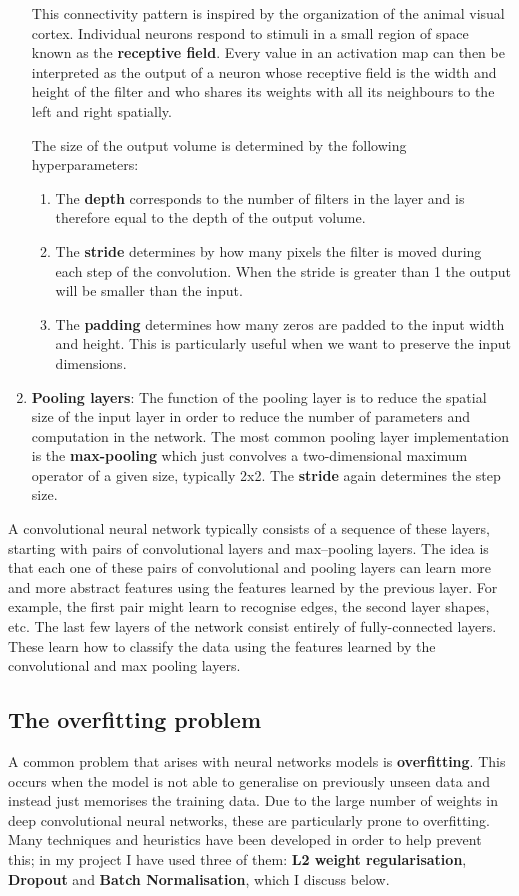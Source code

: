 \documentclass[12pt,a4paper,twoside,openright]{report}
\begin{document}
\begin{enumerate}
	This connectivity pattern is inspired by the organization of the animal visual cortex. Individual neurons respond to stimuli in a small region of space known as the \textbf{receptive field}. Every value in an activation map can then be interpreted as the output of a neuron whose receptive field is the width and height of the filter and who shares its weights with all its neighbours to the left and right spatially.

	The size of the output volume is determined by the following hyperparameters:
	\begin{enumerate}
		\item The \textbf{depth} corresponds to the number of filters in the layer and is therefore equal to the depth of the output volume.
		\item The \textbf{stride} determines by how many pixels the filter is moved during each step of the convolution. When the stride is greater than 1 the output will be smaller than the input.
		\item The \textbf{padding} determines how many zeros are padded to the input width and height. This is particularly useful when we want to preserve the input dimensions.
	\end{enumerate}
	
	\item \textbf{Pooling layers}: The function of the pooling layer is to reduce the spatial size of the input layer in order to reduce the number of parameters and computation in the network. The most common pooling layer implementation is the \textbf{max-pooling} which just convolves a two-dimensional maximum operator of a given size, typically 2x2. The \textbf{stride} again determines the step size.

\end{enumerate}

A convolutional neural network typically consists of a sequence of these layers, starting with pairs of convolutional layers and max--pooling layers. The idea is that each one of these pairs of convolutional and pooling layers can learn more and more abstract features using the features learned by the previous layer. For example, the first pair might learn to recognise edges, the second layer shapes, etc. The last few layers of the network consist entirely of fully-connected layers. These learn how to classify the data using the features learned by the convolutional and max pooling layers.

\subsection{The overfitting problem}
A common problem that arises with neural networks models is \textbf{overfitting}. This occurs when the model is not able to generalise on previously unseen data and instead just memorises the training data. Due to the large number of weights in deep convolutional neural networks, these are particularly prone to overfitting. Many techniques and heuristics have been developed in order to help prevent this; in my project I have used three of them: \textbf{L2 weight regularisation}, \textbf{Dropout} and \textbf{Batch Normalisation}, which I discuss below.
\end{document}

